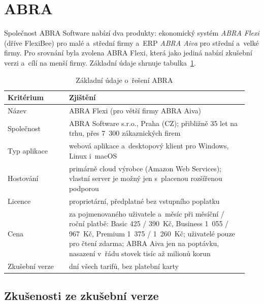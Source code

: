 \section{ABRA}\label{sec:reserse-abra}

Společnost ABRA Software nabízí dva produkty: ekonomický systém \emph{ABRA Flexi} (dříve FlexiBee) pro malé a~střední firmy a~ERP \emph{ABRA Aiva} pro střední a~velké firmy. Pro srovnání byla zvolena ABRA Flexi, která jako jediná nabízí zkušební verzi a~cílí na menší firmy. Základní údaje shrnuje tabulka~\ref{tab:reserse-abra}.

\begin{table}[H]
\centering
\small
\begin{tabular}{>{\raggedright\arraybackslash}p{0.24\linewidth}>{\raggedright\arraybackslash}p{0.70\linewidth}}
\hline
\textbf{Kritérium} & \textbf{Zjištění} \\
\hline
Název & ABRA Flexi (pro větší firmy ABRA Aiva) \\
Společnost & ABRA Software s.r.o., Praha (CZ); přibližně 35 let na trhu, přes 7~300 zákaznických firem \cite{abra-web} \\
Typ aplikace & webová aplikace a~desktopový klient pro Windows, Linux i~macOS \cite{abra-flexi-cenik} \\
Hostování & primárně cloud výrobce (Amazon Web Services); vlastní server je možný jen s~placenou rozšířenou podporou \cite{abra-flexi-cenik} \\
Licence & proprietární, předplatné bez vstupního poplatku \cite{abra-web} \\
Cena & za pojmenovaného uživatele a~měsíc při měsíční / roční platbě: Basic 425 / 390~Kč, Business 1~055 / 967~Kč, Premium 1~375 / 1~260~Kč; uživatelé pouze pro čtení zdarma; ABRA Aiva jen na poptávku, nasazení v~řádu stovek tisíc až milionů korun \cite{abra-flexi-cenik,abra-aiva-cena} \\
Zkušební verze & 30 dní všech tarifů, bez platební karty \cite{abra-flexi-cenik} \\
\hline
\end{tabular}
\caption{Základní údaje o~řešení ABRA}\label{tab:reserse-abra}
\end{table}

\subsection{Zkušenosti ze zkušební verze}

